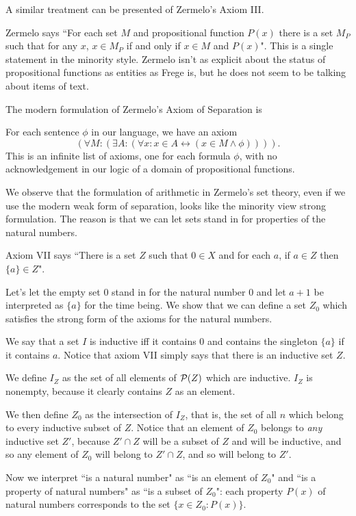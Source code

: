 \documentclass[12pt]{article}
\begin{document}
A similar treatment can be presented of Zermelo's Axiom III.

Zermelo says ``For each set $M$ and propositional function $P(x)$ there is a set $M_P$ such that for any $x$, $x \in M_P$ if and only if $x \in M$ and $P(x)$".  This is a single statement in the minority style.  Zermelo isn't as explicit about the status of
propositional functions as entities as Frege is, but he does not seem to be talking about items of text.

The modern formulation of Zermelo's Axiom of Separation is

For each sentence $\phi$ in our language, we have an axiom $$(\forall M:(\exists A:(\forall x:x \in A \leftrightarrow (x \in M \wedge \phi)))).$$ This is an infinite list of axioms, one for each formula $\phi$, with no acknowledgement in our logic of a domain of propositional functions.

We observe that the formulation of arithmetic in Zermelo's set theory, even if we use the modern weak form of separation, looks
like the minority view strong formulation.  The reason is that we can let sets stand in for properties of the natural numbers.

Axiom VII says ``There is a set $Z$ such that $0 \in X$ and for each $a$, if $a \in Z$ then $\{a\} \in Z$".

Let's let the empty set 0 stand in for the natural number 0 and let $a+1$ be interpreted as $\{a\}$ for the time being.  We show 
that we can define a set $Z_0$ which satisfies the strong form of the axioms for the natural numbers.

We say that a set $I$ is inductive iff it contains 0 and contains the singleton $\{a\}$ if it contains $a$.  Notice that axiom VII
simply says that there is an inductive set $Z$.

We define $I_Z$ as the set of all elements of ${\cal P}(Z)$ which are inductive.  $I_Z$ is nonempty, because it clearly contains $Z$ as an element.

We then define $Z_0$ as the intersection of $I_Z$, that is, the set of all $n$ which belong to every inductive subset of $Z$.
Notice that an element of $Z_0$ belongs to {\em any\/} inductive set $Z'$, because $Z' \cap Z$ will be a subset of $Z$ and will be inductive, and so any element of $Z_0$ will belong to $Z'\cap Z$, and so will belong to $Z'$.

Now we interpret ``is a natural number" as ``is an element of $Z_0$" and ``is a property of natural numbers" as
``is a subset of $Z_0$":  each property $P(x)$ of natural numbers corresponds to the set $\{x \in Z_0:P(x)\}$.
\end{document}
